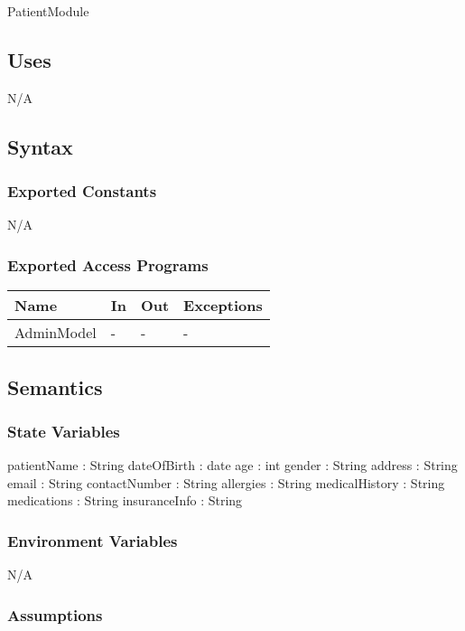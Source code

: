\documentclass[12pt, titlepage]{article}
\begin{document}
PatientModule

\subsection{Uses}

N/A

\subsection{Syntax}

\subsubsection{Exported Constants}

N/A

\subsubsection{Exported Access Programs}

\begin{center}
\begin{tabular}{p{3cm} p{4cm} p{4cm} p{3.5cm}}
\hline
\textbf{Name} & \textbf{In} & \textbf{Out} & \textbf{Exceptions} \\
\hline
AdminModel & - & - & - & \\ 
\hline
\end{tabular}
\end{center}

\subsection{Semantics}

\subsubsection{State Variables}

patientName : String
dateOfBirth : date
age : int
gender : String
address : String
email : String
contactNumber : String
allergies : String
medicalHistory : String
medications : String
insuranceInfo : String

\subsubsection{Environment Variables}

N/A

\subsubsection{Assumptions}
\end{document}
